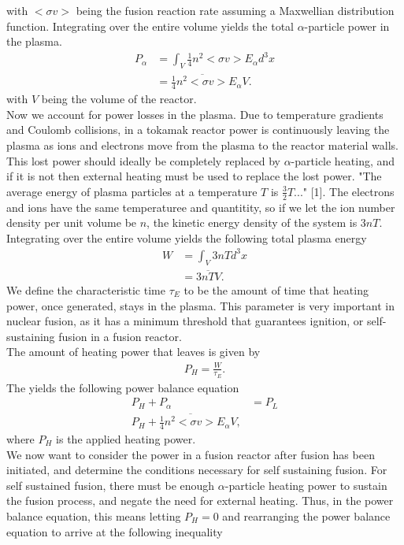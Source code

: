 \documentclass{article}
\begin{document}
with $<\sigma v>$ being the fusion reaction rate assuming a Maxwellian distribution function. 
Integrating over the entire volume yields the total $\alpha$-particle power in the plasma.
\begin{align*}
P_\alpha &= \int_V \frac{1}{4} n^2 <\sigma v> E_{\alpha} d^3x\\
	     &=  \frac{1}{4}\overline{n^2<\sigma v>}E_{\alpha}V.
\end{align*}
 with $V$ being the volume of the reactor.\\
Now we account for power losses in the plasma. Due to temperature gradients and Coulomb collisions, in a tokamak reactor power is continuously leaving the plasma as ions and electrons move from the plasma to the reactor material walls. This lost power should ideally be completely replaced by $\alpha$-particle heating, and if it is not then external heating must be used to replace the lost power. "The average energy of plasma particles at a temperature $T$ is $\frac{3}{2} T$..." [1]. The electrons and ions have the same temperaturee and quantitity, so if we let the ion number density per unit volume be $n$, the kinetic energy density of the  system is $3nT$. Integrating over the entire volume yields the following total plasma energy 
\begin{align*}
W &= \int_{V}3nTd^3x\\
    &=3\overline{nT}V.
\end{align*}
We define the characteristic time $\tau_E$ to be the amount of time that heating power, once generated, stays in the plasma. This parameter is very important in nuclear fusion, as it has a minimum threshold that guarantees ignition, or self-sustaining fusion in a fusion reactor.\\ The amount of heating power that leaves is given by 
\begin{align*}
P_H = \frac{W}{\tau_E}.
\end{align*}
The yields the following power balance equation
\begin{align*}
P_H + P_{\alpha} &= P_L\\
P_H + \frac{1}{4}\overline{n^2 <\sigma v>}E_{\alpha} V,
\end{align*}
where $P_H$ is the applied heating power.\\
We now want to consider the power in a fusion reactor after fusion has been initiated, and determine the conditions necessary for self sustaining fusion. For self sustained fusion,  there must be enough $\alpha$-particle heating power to sustain the fusion process, and negate the need for external heating. Thus, in the power balance equation, this means letting $P_H =0$ and rearranging the power balance equation to arrive at the following inequality
\end{document}
